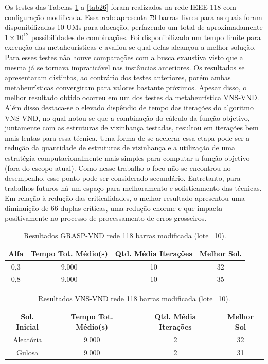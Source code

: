 \documentclass[12pt]{article}
\begin{document}
Os testes das Tabelas \ref{tab24} a \ref{tab26} foram realizados na rede IEEE 118 com configuração modificada. Essa rede apresenta 79 barras livres para as quais foram disponibilizadas 10 UMs para alocação, perfazendo um total de aproximadamente $1 \times 10^{12}$ possibilidades de combinações. Foi disponibilizado um tempo limite para execução das metaheurísticas e avaliou-se qual delas alcançou a melhor solução. Para esses testes não houve comparações com a busca exaustiva visto que a mesma já se tornava impraticável nas instâncias anteriores. Os resultados se apresentaram distintos, ao contrário dos testes anteriores, porém ambas metaheurísticas convergiram para valores bastante próximos. Apesar disso, o melhor resultado obtido ocorreu em um dos testes da metaheurística VNS-VND. Além disso destaca-se o elevado dispêndio de tempo das iterações do algoritmo VNS-VND, no qual notou-se que a combinação do cálculo da função objetivo, juntamente com as estruturas de vizinhança testadas, resultou em iterações bem mais lentas para essa técnica. Uma forma de se acelerar essa etapa pode ser a redução da quantidade de estruturas de vizinhança e a utilização de uma estratégia computacionalmente mais simples para computar a função objetivo (fora do escopo atual). Como nesse trabalho o foco não se encontrou no desempenho, esse ponto pode ser considerado secundário. Entretanto, para trabalhos futuros há um espaço para melhoramento e sofisticamento das técnicas. Em relação à redução das criticalidades, o melhor resultado apresentou uma diminuição de 66 duplas críticas, uma redução enorme e que impacta positivamente no processo de processamento de erros grosseiros.

\begin{table}[H]
	\centering
	\caption{Resultados GRASP-VND rede 118 barras modificada (lote=10).}
	\begin{tabular}{|c|c|c|c|}
		\hline
		\textbf{Alfa} & \textbf{Tempo Tot. Médio(s)} & \textbf{Qtd. Média Iterações} & \textbf{Melhor Sol.} \\
		\hline
		0,3   & 9.000 & 10    & 32 \\
		\hline
		0,8   & 9.000 & 10    & 35 \\
		\hline
	\end{tabular}%
	\label{tab24}%
\end{table}%

\begin{table}[H]
	\centering
	\caption{Resultados VNS-VND rede 118 barras modificada (lote=10).}
	\begin{tabular}{|c|c|c|c|}
		\hline
		\textbf{Sol. Inicial} & \textbf{Tempo Tot. Médio(s)} & \textbf{Qtd. Média Iterações} & \textbf{Melhor Sol} \\
		\hline
		Aleatória & 9.000 & 2     & 32 \\
		\hline
		Gulosa & 9.000 & 2     & 31 \\
		\hline
	\end{tabular}%
	\label{tab25}%
\end{table}%
\end{document}
